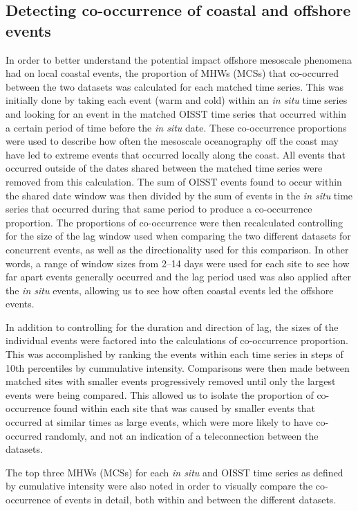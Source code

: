 \documentclass[a4paper,10pt,review]{elsarticle}
\begin{document}
\subsection{Detecting co-occurrence of coastal and offshore events}
In order to better understand the potential impact offshore mesoscale phenomena had on local coastal events, the proportion of MHWs (MCSs) that co-occurred between the two datasets was calculated for each matched time series. This was initially done by taking each event (warm and cold) within an \emph{in situ} time series and looking for an event in the matched OISST time series that occurred within a certain period of time before the \emph{in situ} date. These co-occurrence proportions were used to describe how often the mesoscale oceanography off the coast may have led to extreme events that occurred locally along the coast. All events that occurred outside of the dates shared between the matched time series were removed from this calculation. The sum of OISST events found to occur within the shared date window was then divided by the sum of events in the \emph{in situ} time series that occurred during that same period to produce a co-occurrence proportion. The proportions of co-occurrence were then recalculated controlling for the size of the lag window used when comparing the two different datasets for concurrent events, as well as the directionality used for this comparison. In other words, a range of window sizes from 2--14 days were used for each site to see how far apart events generally occurred and the lag period used was also applied after the \emph{in situ} events, allowing us to see how often coastal events led the offshore events.

In addition to controlling for the duration and direction of lag, the sizes of the individual events were factored into the calculations of co-occurrence proportion. This was accomplished by ranking the events within each time series in steps of 10th percentiles by cummulative intensity. Comparisons were then made between matched sites with smaller events progressively removed until only the largest events were being compared. This allowed us to isolate the proportion of co-occurrence found within each site that was caused by smaller events that occurred at similar times as large events, which were more likely to have co-occurred randomly, and not an indication of a teleconnection between the datasets.

The top three MHWs (MCSs) for each \emph{in situ} and OISST time series as defined by cumulative intensity were also noted in order to visually compare the co-occurrence of events in detail, both within and between the different datasets.
\end{document}
